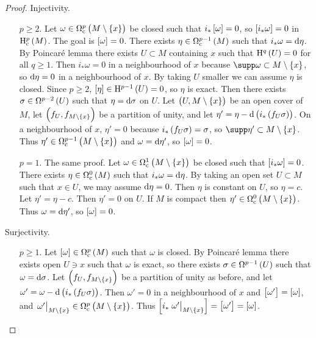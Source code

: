 \begin{proof}
Injectivity.
\begin{itemize}[leftmargin=0.5in]
\item[$ p \ge 2 $.] Let $ \omega \in \Omega_\c^p\br{M \setminus \cbr{x}} $ be closed such that $ i_*\sbr{\omega} = 0 $, so $ \sbr{i_*\omega} = 0 $ in $ \H_\c^p\br{M} $. The goal is $ \sbr{\omega} = 0 $. There exists $ \eta \in \Omega_\c^{p - 1}\br{M} $ such that $ i_*\omega = \mathrm{d}\eta $. By Poincar\'e lemma there exists $ U \subset M $ containing $ x $ such that $ \H^q\br{U} = 0 $ for all $ q \ge 1 $. Then $ i_*\omega = 0 $ in a neighbourhood of $ x $ because $ \supp \omega \subset M \setminus \cbr{x} $, so $ \mathrm{d}\eta = 0 $ in a neighbourhood of $ x $. By taking $ U $ smaller we can assume $ \eta $ is closed. Since $ p \ge 2 $, $ \sbr{\eta} \in \H^{p - 1}\br{U} = 0 $, so $ \eta $ is exact. Then there exists $ \sigma \in \Omega^{p - 2}\br{U} $ such that $ \eta = \mathrm{d}\sigma $ on $ U $. Let $ \br{U, M \setminus \cbr{x}} $ be an open cover of $ M $, let $ \br{f_U, f_{M \setminus \cbr{x}}} $ be a partition of unity, and let $ \eta' = \eta - \d\br{i_*\br{f_U\sigma}} $. On a neighbourhood of $ x $, $ \eta' = 0 $ because $ i_*\br{f_U\sigma} = \sigma $, so $ \supp \eta' \subset M \setminus \cbr{x} $. Thus $ \eta' \in \Omega_\c^{p - 1}\br{M \setminus \cbr{x}} $ and $ \omega = \mathrm{d}\eta' $, so $ \sbr{\omega} = 0 $.
\item[$ p = 1 $.] The same proof. Let $ \omega \in \Omega_\c^1\br{M \setminus \cbr{x}} $ be closed such that $ \sbr{i_*\omega} = 0 $. There exists $ \eta \in \Omega_\c^0\br{M} $ such that $ i_*\omega = \mathrm{d}\eta $. By taking an open set $ U \subset M $ such that $ x \in U $, we may assume $ \mathrm{d}\eta = 0 $. Then $ \eta $ is constant on $ U $, so $ \eta = c $. Let $ \eta' = \eta - c $. Then $ \eta' = 0 $ on $ U $. If $ M $ is compact then $ \eta' \in \Omega_\c^0\br{M \setminus \cbr{x}} $. Thus $ \omega = \mathrm{d}\eta' $, so $ \sbr{\omega} = 0 $.
\end{itemize}
Surjectivity.
\begin{itemize}[leftmargin=0.5in]
\item[$ p \ge 1 $.] Let $ \sbr{\omega} \in \Omega_\c^p\br{M} $ such that $ \omega $ is closed. By Poincar\'e lemma there exists open $ U \ni x $ such that $ \omega $ is exact, so there exists $ \sigma \in \Omega^{p - 1}\br{U} $ such that $ \omega = \mathrm{d}\sigma $. Let $ \br{f_U, f_{M \setminus \cbr{x}}} $ be a partition of unity as before, and let $ \omega' = \omega - \d\br{i_*\br{f_U\sigma}} $. Then $ \omega' = 0 $ in a neighbourhood of $ x $ and $ \sbr{\omega'} = \sbr{\omega} $, and $ \eval{\omega'}_{M \setminus \cbr{x}} \in \Omega_\c^p\br{M \setminus \cbr{x}} $. Thus $ \sbr{i_*\eval{\omega'}_{M \setminus \cbr{x}}} = \sbr{\omega'} = \sbr{\omega} $.
\end{itemize}
\end{proof}

